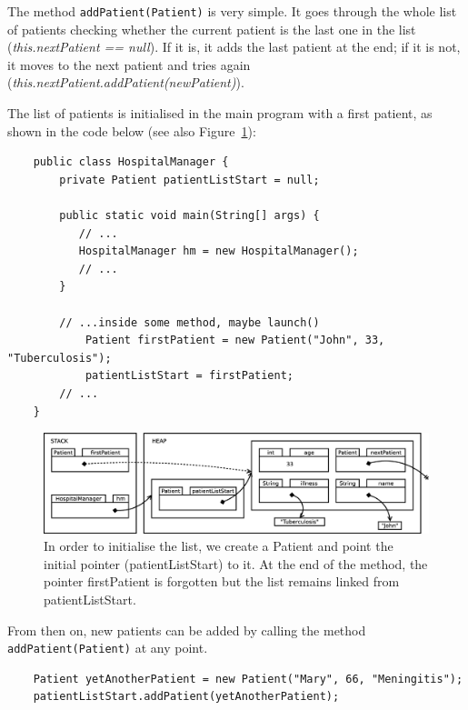 The method \verb+addPatient(Patient)+ is very simple. It goes through
the whole list of patients checking whether the current patient is the
last one in the list (\emph{this.nextPatient == null}). 
If it is, it adds the last patient at the
end; if it is not, it moves to the next patient and tries 
again (\emph{this.nextPatient.addPatient(newPatient)}). 

The list of patients is initialised in the main program with a first
patient, as shown in the code below (see also Figure~\ref{fig:jkhsdfj}):

\begin{verbatim}
    public class HospitalManager {
        private Patient patientListStart = null;

        public static void main(String[] args) {
           // ...
           HospitalManager hm = new HospitalManager();
           // ...
        }

        // ...inside some method, maybe launch()
            Patient firstPatient = new Patient("John", 33, "Tuberculosis");
            patientListStart = firstPatient;
        // ...
    }
\end{verbatim}


\begin{figure}[bthp]
  \centering
  \includegraphics[width=\textwidth]{gfx/lists-init-full}  
  \caption{In order to initialise the list, we create a Patient and
    point the initial pointer (patientListStart) to it. At the end of
    the method, the pointer firstPatient is forgotten but the list
    remains linked from patientListStart.}
  \label{fig:jkhsdfj}
\end{figure}

From then on, new patients can be added by calling the
method \verb+addPatient(Patient)+ at any point. 

\begin{verbatim}
    Patient yetAnotherPatient = new Patient("Mary", 66, "Meningitis");
    patientListStart.addPatient(yetAnotherPatient);
\end{verbatim}

